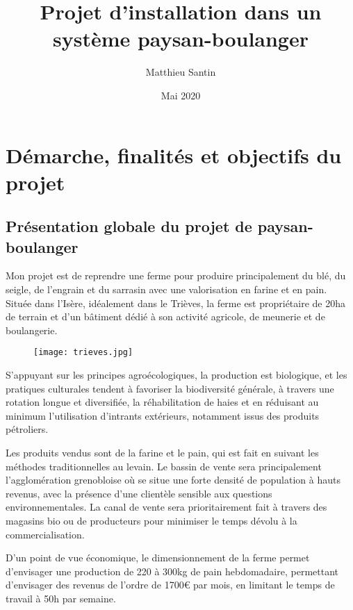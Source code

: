 \documentclass{book}
\title{Projet d'installation dans un système paysan-boulanger}
\date{Mai 2020}
\author{Matthieu Santin}
\begin{document}
\maketitle

\tableofcontents

\chapter{Démarche, finalités et objectifs du projet}

\section{Présentation globale du projet de paysan-boulanger}

Mon projet est de reprendre une ferme pour produire principalement du blé, du seigle, de l'engrain et du sarrasin avec une valorisation en farine et en pain. Située dans l'Isère, idéalement dans le Trièves, la ferme est propriétaire de 20ha de terrain et d'un bâtiment dédié à son activité agricole, de meunerie et de boulangerie. 

\begin{figure}[h!]
\begin{center}
	\texttt{[image: trieves.jpg]}
\end{center}
\end{figure}

S'appuyant sur les principes agroécologiques, la production est biologique, et les pratiques culturales tendent à favoriser la biodiversité générale, à travers une rotation longue et diversifiée, la réhabilitation de haies et en réduisant au minimum l'utilisation d'intrants extérieurs, notamment issus des produits pétroliers.

Les produits vendus sont de la farine et le pain, qui est fait en suivant les méthodes traditionnelles au levain. Le bassin de vente sera principalement l'agglomération grenobloise où se situe une forte densité de population à hauts revenus, avec la présence d'une clientèle sensible aux questions environnementales. La canal de vente sera prioritairement fait à travers des magasins bio ou de producteurs pour minimiser le temps dévolu à la commercialisation.

D'un point de vue économique, le dimensionnement de la ferme permet d'envisager une production de 220 à 300kg de pain hebdomadaire, permettant d'envisager des revenus de l'ordre de 1700\euro{} par mois, en limitant le temps de travail à 50h par semaine. 
\end{document}
